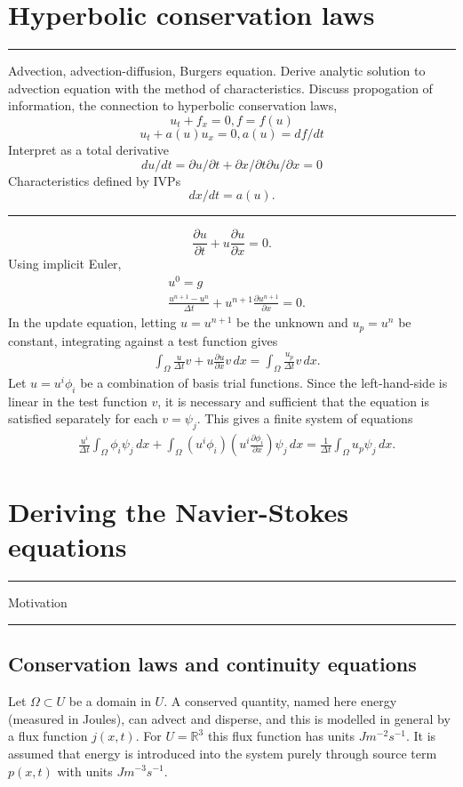 \documentclass{article}
\newcommand{\pdf}[2]{\frac{\partial #1}{\partial #2}}
\newcommand{\todo}[1]{\vskip 0.1in \hrule \vskip 0.03in {#1} \vskip 0.03in \hrule \vskip 0.1in}
\begin{document}
\section{Hyperbolic conservation laws}
\todo{
Advection, advection-diffusion, Burgers equation.
Derive analytic solution to advection equation with the method of characteristics.
Discuss propogation of information, the connection to hyperbolic conservation laws,
$$u_t + f_x = 0, f = f(u)$$
$$u_t + a(u)u_x = 0, a(u) = df/dt$$
Interpret as a total derivative
$$du/dt = \partial u /\partial t + \partial x / \partial t \partial u / \partial x = 0$$
Characteristics defined by IVPs
$$dx/dt = a(u).$$
}
\begin{equation}
    \pdf{u}{t} + u\pdf{u}{x} = 0.
\end{equation}
Using implicit Euler,
\begin{align*}
    &u^0 = g \\
    &\frac{u^{n+1} - u^n}{\Delta t} + u^{n+1}\pdf{u^{n+1}}{x} = 0.
\end{align*}
In the update equation, letting $u = u^{n+1}$ be the unknown and $u_p = u^n$ be constant, integrating against a test function gives
\begin{align*}
    &\int_\Omega \frac{u}{\Delta t}v + u\pdf{u}{x}v\,dx = \int_\Omega \frac{u_p}{\Delta t} v\,dx.
\end{align*}
Let $u = u^i\phi_i$ be a combination of basis trial functions. Since the left-hand-side is linear in the test function $v$, it is necessary and sufficient
that the equation is satisfied separately for each $v = \psi_j$. This gives a finite system of equations
\begin{align*}
    &\frac{u^i}{\Delta t}\int_\Omega \phi_i\psi_j\,dx + \int_{\Omega} (u^i\phi_i)(u^i \pdf{\phi_i}{x})\psi_j\,dx = \frac{1}{\Delta t}\int_\Omega u_p \psi_j\,dx.
\end{align*}




\section{Deriving the Navier-Stokes equations}
\todo{Motivation}
\subsection{Conservation laws and continuity equations} %
Let $\Omega \subset U$ be a domain in $U$. A conserved quantity, named here energy (measured in Joules), can advect and disperse, and this is modelled in general by
a flux function $j(x, t)$. For $U = \mathbb{R}^3$ this flux function has units $Jm^{-2}s^{-1}$.
It is assumed that energy is introduced into
the system purely through source term $p(x, t)$ with units $Jm^{-3}s^{-1}$.
\end{document}
